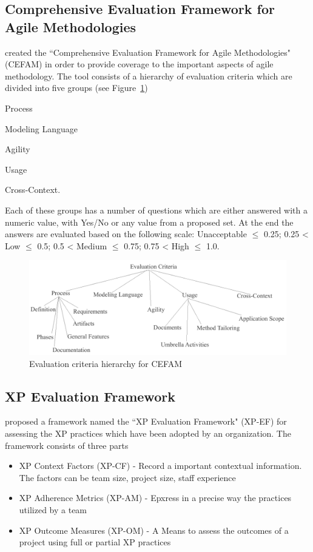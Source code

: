 \subsection{Comprehensive Evaluation Framework for Agile Methodologies}
\citet{cefam} created the ``Comprehensive Evaluation Framework for Agile Methodologies" (CEFAM) in order to provide coverage to the important aspects of agile methodology. The tool consists of a hierarchy of evaluation criteria which are divided into five groups (see Figure~\ref{cefam})
\begin{inparaenum} [a\upshape)]
\item Process
\item Modeling Language
\item Agility
\item Usage
\item Cross-Context.
\end{inparaenum}
Each of these groups has a number of questions which are either answered with a numeric value, with Yes/No or any value from a proposed set. At the end the answers are evaluated based on the following scale: Unacceptable $\leq$ 0.25; 0.25 < Low $\leq$ 0.5; 0.5 < Medium $\leq$ 0.75; 0.75 < High $\leq$ 1.0.

\begin{figure} [H]
\centerline{\includegraphics[scale=0.75]{include/relatedwork/fig/cefam.pdf}}
\caption{Evaluation criteria hierarchy for CEFAM} 
\label{cefam}
\end{figure}

\subsection{XP Evaluation Framework} %
\citet{williams2004toward} proposed a framework named the ``XP Evaluation Framework" (XP-EF) for assessing the XP practices which have been adopted by an organization. The framework consists of three parts
\begin{itemize}
\item XP Context Factors (XP-CF) - Record a important contextual information. The factors can be team size, project size, staff experience
\item XP Adherence Metrics (XP-AM) - Epxress in a precise way the practices utilized by a team
\item XP Outcome Measures (XP-OM) - A Means to assess the outcomes of a project using full or partial XP practices
\end{itemize}


